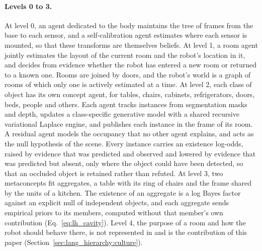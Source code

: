 \paragraph{Levels 0 to 3.}
At level 0, an agent dedicated to the body maintains the tree of frames from the base to each sensor, and a
self-calibration agent estimates where each sensor is mounted, so that these transforms are themselves beliefs. At
level 1, a room agent jointly estimates the layout of the current room and the robot's location in it, and decides
from evidence whether the robot has entered a new room or returned to a known one. Rooms are joined by doors, and the
robot's world is a graph of rooms of which only one is actively estimated at a time. At level 2, each class of object
has its own concept agent, for tables, chairs, cabinets, refrigerators, doors, beds, people and others. Each agent
tracks instances from segmentation masks and depth, updates a class-specific generative model with a shared recursive
variational Laplace engine, and publishes each instance in the frame of its room. A residual agent models the
occupancy that no other agent explains, and acts as the null hypothesis of the scene. Every instance carries an
existence log-odds, raised by evidence that was predicted and observed and lowered by evidence that was predicted but
absent, only where the object could have been detected, so that an occluded object is retained rather than refuted.
At level 3, two metaconcepts fit aggregates, a table with its ring of chairs and the frame shared by the units of a
kitchen. The existence of an aggregate is a log Bayes factor against an explicit null of independent objects, and
each aggregate sends empirical priors to its members, computed without that member's own contribution
(Eq.~\eqref{eq:lh_cavity}). Level 4, the purpose of a room and how the robot should behave there, is not represented
in \cortex{} and is the contribution of this paper (Section~\ref{sec:lang_hierarchy:culture}).



